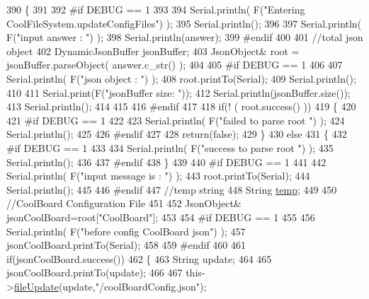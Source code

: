 \begin{DoxyCode}
390 \{
391 
392 \textcolor{preprocessor}{#if DEBUG == 1}
393 
394     Serial.println( F(\textcolor{stringliteral}{"Entering CoolFileSystem.updateConfigFiles"}) );
395     Serial.println();
396     
397     Serial.println( F(\textcolor{stringliteral}{"input answer : "}) );
398     Serial.println(answer);
399 \textcolor{preprocessor}{#endif}
400 
401     \textcolor{comment}{//total json object }
402     DynamicJsonBuffer jsonBuffer;
403     JsonObject& root = jsonBuffer.parseObject( answer.c\_str() );
404 
405 \textcolor{preprocessor}{#if DEBUG == 1}
406     
407     Serial.println( F(\textcolor{stringliteral}{"json object : "}) );  
408     root.printTo(Serial);
409     Serial.println();
410     
411     Serial.print(F(\textcolor{stringliteral}{"jsonBuffer size: "}));
412     Serial.println(jsonBuffer.size());
413     Serial.println();
414 
415 
416 \textcolor{preprocessor}{#endif}
417 
418     \textcolor{keywordflow}{if}(! ( root.success() ))
419     \{
420     
421 \textcolor{preprocessor}{    #if DEBUG == 1}
422 
423         Serial.println( F(\textcolor{stringliteral}{"failed to parse root "}) );
424         Serial.println();
425     
426 \textcolor{preprocessor}{    #endif}
427 
428         \textcolor{keywordflow}{return}(\textcolor{keyword}{false});
429     \}
430     \textcolor{keywordflow}{else}
431     \{
432 \textcolor{preprocessor}{    #if DEBUG == 1}
433         
434         Serial.println( F(\textcolor{stringliteral}{"success to parse root "}) );
435         Serial.println();
436         
437 \textcolor{preprocessor}{    #endif  }
438     \}
439     
440 \textcolor{preprocessor}{#if DEBUG == 1}
441 
442     Serial.println( F(\textcolor{stringliteral}{"input message is : "}) );
443     root.printTo(Serial);
444     Serial.println();
445 
446 \textcolor{preprocessor}{#endif}
447     \textcolor{comment}{//temp string}
448     String \hyperlink{_irene3000_8h_a5905d48604152cf57aa6bfa087b49173}{temp};
449 
450     \textcolor{comment}{//CoolBoard Configuration File}
451 
452         JsonObject& jsonCoolBoard=root[\textcolor{stringliteral}{"CoolBoard"}];
453 
454 \textcolor{preprocessor}{#if DEBUG == 1}
455 
456     Serial.println( F(\textcolor{stringliteral}{"before config CoolBoard json"}) );
457     jsonCoolBoard.printTo(Serial);
458 
459 \textcolor{preprocessor}{#endif}
460 
461     \textcolor{keywordflow}{if}(jsonCoolBoard.success())
462     \{
463         String update;
464     
465         jsonCoolBoard.printTo(update);
466 
467         this->\hyperlink{class_cool_file_system_a13f2958f5b87757c31fc53797a30d23a}{fileUpdate}(update,\textcolor{stringliteral}{"/coolBoardConfig.json"});     

\end{DoxyCode}
